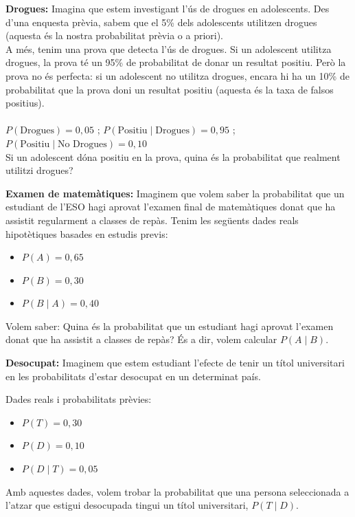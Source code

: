 \documentclass[12pt]{article}
\begin{document}
\begin{exercici} \noindent 
\textbf{Drogues:} Imagina que estem investigant l'ús de drogues en adolescents. Des d'una enquesta prèvia, sabem que el 5\% dels adolescents utilitzen drogues (aquesta és la nostra probabilitat prèvia o a priori).\\

A més, tenim una prova que detecta l'ús de drogues. Si un adolescent utilitza drogues, la prova té un 95\% de probabilitat de donar un resultat positiu. Però la prova no és perfecta: si un adolescent no utilitza drogues, encara hi ha un 10\% de probabilitat que la prova doni un resultat positiu (aquesta és la taxa de falsos positius).\\\\
$P(\text{Drogues}) = 0,05$ \;; $P(\text{Positiu} \mid \text{Drogues}) = 0,95$ \;; $P(\text{Positiu} \mid \text{No Drogues}) = 0,10$\\

Si un adolescent dóna positiu en la prova, quina és la probabilitat que realment utilitzi drogues?\\



\end{exercici}

\begin{exercici} \noindent 
\textbf{Examen de matemàtiques:} Imaginem que volem saber la probabilitat que un estudiant de l'ESO hagi aprovat l'examen final de matemàtiques donat que ha assistit regularment a classes de repàs. Tenim les següents dades reals hipotètiques basades en estudis previs:

\begin{itemize}
    \item $P(A) = 0,65$
    \item $P(B) = 0,30$
    \item $P(B \mid A) = 0,40$
\end{itemize}

Volem saber: Quina és la probabilitat que un estudiant hagi aprovat l'examen donat que ha assistit a classes de repàs? És a dir, volem calcular $P(A \mid B)$.
\end{exercici}

\begin{exercici} \noindent 
\textbf{Desocupat:} Imaginem que estem estudiant l'efecte de tenir un títol universitari en les probabilitats d'estar desocupat en un determinat país.

Dades reals i probabilitats prèvies:

\begin{itemize}
    \item $P(T) = 0,30$
    \item $P(D) = 0,10$
    \item $P(D \mid T) = 0,05$
\end{itemize}

Amb aquestes dades, volem trobar la probabilitat que una persona seleccionada a l'atzar que estigui desocupada tingui un títol universitari, $P(T \mid D)$.
\end{exercici}
\end{document}
